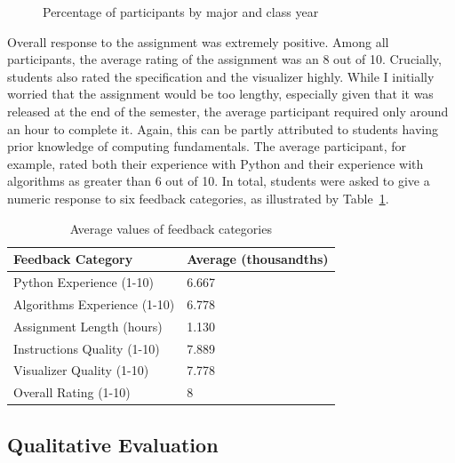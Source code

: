 \documentclass[pageno]{jpaper}
\begin{document}
\begin{figure}[hbt]
\centering
\usetikzlibrary {shadows}
\caption{Percentage of participants by major and class year}
\label{fig:breakdown}
\end{figure}

Overall response to the assignment was extremely positive. Among all participants, the average rating of the assignment was an 8 out of 10. Crucially, students also rated the specification and the visualizer highly. While I initially worried that the assignment would be too lengthy, especially given that it was released at the end of the semester, the average participant required only around an hour to complete it. Again, this can be partly attributed to students having prior knowledge of computing fundamentals. The average participant, for example, rated both their experience with Python and their experience with algorithms as greater than 6 out of 10. In total, students were asked to give a numeric response to six feedback categories, as illustrated by Table~\ref{table:averages}.

\begin{table}[hbt]
\centering
\begin{tabular}{|l|l|}
\hline
Feedback Category & Average (thousandths) \\
\hline
\hline
Python Experience (1-10) & 6.667 \\
 \hline
Algorithms Experience (1-10) & 6.778 \\
\hline
Assignment Length (hours) & 1.130 \\
\hline
Instructions Quality (1-10) & 7.889 \\
\hline
Visualizer Quality (1-10) & 7.778 \\
\hline
Overall Rating (1-10) & 8 \\
\hline
\end{tabular}
\caption{Average values of feedback categories}
\label{table:averages}
\end{table}

\subsection{Qualitative Evaluation}
\end{document}
